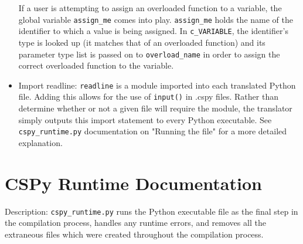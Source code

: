 \documentclass{article}
\begin{document}
\begin{itemize}
If a user is attempting to assign an overloaded function to a variable, the global variable \verb|assign_me| comes into play. \verb|assign_me| holds the name of the identifier to which a value is being assigned. In \verb|c_VARIABLE|, the identifier's type is looked up (it matches that of an overloaded function) and its parameter type list is passed on to \verb|overload_name| in order to assign the correct overloaded function to the variable.
\item Import readline: \verb|readline| is a module imported into each translated Python file. Adding this allows for the use of \verb|input()| in .cspy files. Rather than determine whether or not a given file will require the module, the translator simply outputs this import statement to every Python executable. See \verb|cspy_runtime.py| documentation on "Running the file" for a more detailed explanation.
\end{itemize}
\pagebreak
\section{CSPy Runtime Documentation}
Description: \verb|cspy_runtime.py| runs the Python executable file as the final step in the compilation process, handles any runtime errors, and removes all the extraneous files which were created throughout the compilation process.
\end{document}
